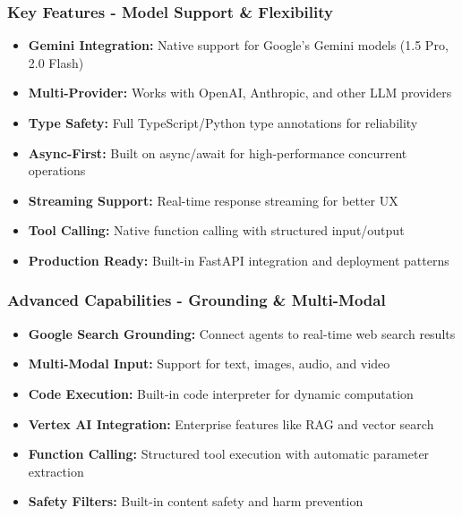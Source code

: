 \begin{frame}[fragile]\frametitle{Key Features - Model Support \& Flexibility}
      \begin{itemize}
	\item \textbf{Gemini Integration:} Native support for Google's Gemini models (1.5 Pro, 2.0 Flash)
	\item \textbf{Multi-Provider:} Works with OpenAI, Anthropic, and other LLM providers
	\item \textbf{Type Safety:} Full TypeScript/Python type annotations for reliability
	\item \textbf{Async-First:} Built on async/await for high-performance concurrent operations
	\item \textbf{Streaming Support:} Real-time response streaming for better UX
	\item \textbf{Tool Calling:} Native function calling with structured input/output
	\item \textbf{Production Ready:} Built-in FastAPI integration and deployment patterns
	  \end{itemize}
\end{frame}

\begin{frame}[fragile]\frametitle{Advanced Capabilities - Grounding \& Multi-Modal}
      \begin{itemize}
	\item \textbf{Google Search Grounding:} Connect agents to real-time web search results
	\item \textbf{Multi-Modal Input:} Support for text, images, audio, and video
	\item \textbf{Code Execution:} Built-in code interpreter for dynamic computation
	\item \textbf{Vertex AI Integration:} Enterprise features like RAG and vector search
	\item \textbf{Function Calling:} Structured tool execution with automatic parameter extraction
	\item \textbf{Safety Filters:} Built-in content safety and harm prevention
	  \end{itemize}
\end{frame}

